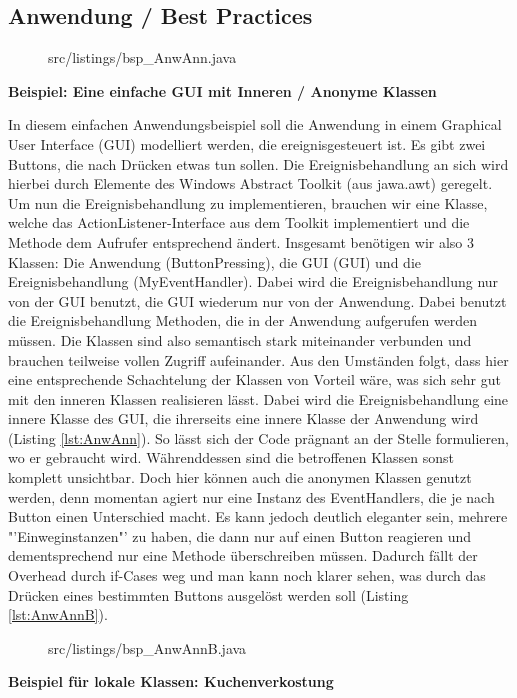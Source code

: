 \newpage
\subsection{Anwendung / Best Practices}


\begin{figure}[H]
\lstset{language=Java}
 {src/listings/bsp_AnwAnn.java}
\end{figure}


{\bf Beispiel: Eine einfache GUI mit Inneren / Anonyme Klassen}

In diesem einfachen Anwendungsbeispiel soll die Anwendung in einem Graphical User Interface (GUI) modelliert werden, die ereignisgesteuert ist.
Es gibt zwei Buttons, die nach Drücken etwas tun sollen.
Die Ereignisbehandlung an sich wird hierbei durch Elemente des Windows Abstract Toolkit (aus jawa.awt) geregelt.
Um nun die Ereignisbehandlung zu implementieren, brauchen wir eine Klasse, welche das ActionListener-Interface aus dem Toolkit implementiert und die Methode dem Aufrufer entsprechend ändert.
Insgesamt benötigen wir also 3 Klassen: Die Anwendung (ButtonPressing), die GUI (GUI) und die Ereignisbehandlung (MyEventHandler). Dabei wird die Ereignisbehandlung nur von der GUI benutzt, die GUI wiederum nur von der Anwendung. Dabei benutzt die Ereignisbehandlung Methoden, die in der Anwendung aufgerufen werden müssen.
Die Klassen sind also semantisch stark miteinander verbunden und brauchen teilweise vollen Zugriff aufeinander.
Aus den Umständen folgt, dass hier eine entsprechende Schachtelung der Klassen von Vorteil wäre, was sich sehr gut mit den inneren Klassen realisieren lässt.
Dabei wird die Ereignisbehandlung eine innere Klasse des GUI, die ihrerseits eine innere Klasse der Anwendung wird (Listing \ref{lst:AnwAnn}).
So lässt sich der Code prägnant an der Stelle formulieren, wo er gebraucht wird.
Währenddessen sind die betroffenen Klassen sonst komplett unsichtbar.
Doch hier können auch die anonymen Klassen genutzt werden, denn momentan agiert nur eine Instanz des EventHandlers, die je nach Button einen Unterschied macht. Es kann jedoch deutlich eleganter sein, mehrere "'Einweginstanzen"' zu haben, die dann nur auf einen Button reagieren und dementsprechend nur eine Methode überschreiben müssen.
Dadurch fällt der Overhead durch if-Cases weg und man kann noch klarer sehen, was durch das Drücken eines bestimmten Buttons ausgelöst werden soll (Listing \ref{lst:AnwAnnB}).
\\
\begin{figure}[H]
\lstset{language=Java}
 {src/listings/bsp_AnwAnnB.java}
\end{figure}
\newpage
{\bf Beispiel für lokale Klassen: Kuchenverkostung}


